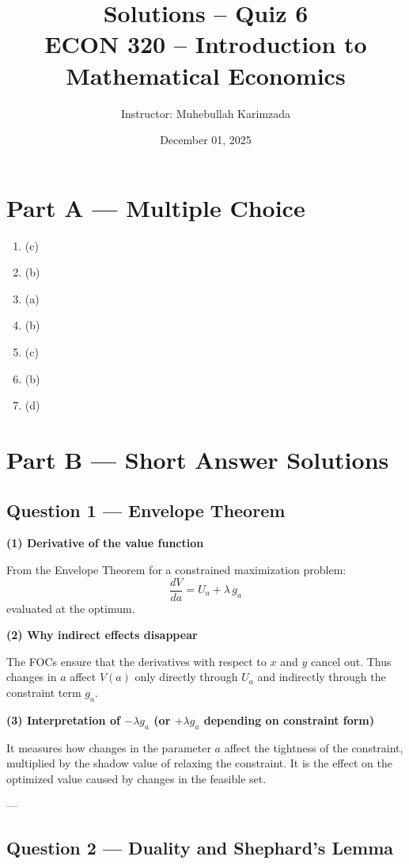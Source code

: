 \documentclass[12pt]{article}
\title{Solutions -- Quiz 6\\ \vspace{5pt}
\large ECON 320 -- Introduction to Mathematical Economics}
\author{Instructor: Muhebullah Karimzada}
\date{December 01, 2025}
\begin{document}
\maketitle

\section*{Part A — Multiple Choice}

\begin{enumerate}
\item (c)  
\item (b)  
\item (a)  
\item (b)  
\item (c)  
\item (b)  
\item (d)  
\end{enumerate}

\newpage

\section*{Part B — Short Answer Solutions}

\subsection*{Question 1 — Envelope Theorem}

\textbf{(1) Derivative of the value function}

From the Envelope Theorem for a constrained maximization problem:
\[
\boxed{
\frac{dV}{da}
= U_a + \lambda\, g_a
}
\]
evaluated at the optimum.

\textbf{(2) Why indirect effects disappear}

The FOCs ensure that the derivatives with respect to $x$ and $y$ cancel out. Thus changes in $a$ affect $V(a)$ only directly through $U_a$ and indirectly through the constraint term $g_a$.

\textbf{(3) Interpretation of $-\lambda g_a$ (or $+\lambda g_a$ depending on constraint form)}

It measures how changes in the parameter $a$ affect the tightness of the constraint, multiplied by the shadow value of relaxing the constraint. It is the effect on the optimized value caused by changes in the feasible set.

---

\subsection*{Question 2 — Duality and Shephard’s Lemma}
\end{document}
